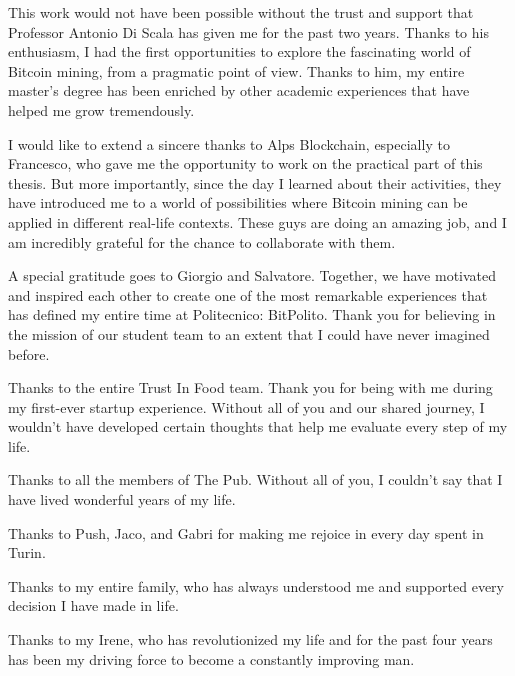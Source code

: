 This work would not have been possible without the trust and support that Professor Antonio Di Scala has given me for the past two years. Thanks to his enthusiasm, I had the first opportunities to explore the fascinating world of Bitcoin mining, from a pragmatic point of view. Thanks to him, my entire master's degree has been enriched by other academic experiences that have helped me grow tremendously.

I would like to extend a sincere thanks to Alps Blockchain, especially to Francesco, who gave me the opportunity to work on the practical part of this thesis. But more importantly, since the day I learned about their activities, they have introduced me to a world of possibilities where Bitcoin mining can be applied in different real-life contexts. These guys are doing an amazing job, and I am incredibly grateful for the chance to collaborate with them.

A special gratitude goes to Giorgio and Salvatore. Together, we have motivated and inspired each other to create one of the most remarkable experiences that has defined my entire time at Politecnico: BitPolito. Thank you for believing in the mission of our student team to an extent that I could have never imagined before.


Thanks to the entire Trust In Food team. Thank you for being with me during my first-ever startup experience. Without all of you and our shared journey, I wouldn't have developed certain thoughts that help me evaluate every step of my life.

Thanks to all the members of The Pub. Without all of you, I couldn't say that I have lived wonderful years of my life.

Thanks to Push, Jaco, and Gabri for making me rejoice in every day spent in Turin.

Thanks to my entire family, who has always understood me and supported every decision I have made in life.

Thanks to my Irene, who has revolutionized my life and for the past four years has been my driving force to become a constantly improving man.
